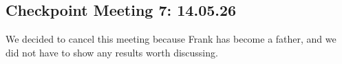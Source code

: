 \subsection{Checkpoint Meeting 7: 14.05.26}\label{subsec:checkpoint-meeting-7}

We decided to cancel this meeting because Frank has become a father,
and we did not have to show any results worth discussing.
